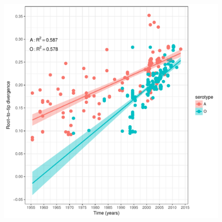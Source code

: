 \documentclass[a4paper,10pt]{article}
\begin{document}
\newpage
\begin{center}
\begin{figure}[H]
\begin{center}
\includegraphics[scale=.75]{FIGURES/PLOTS/rdvs.pdf}
\end{center}
\caption{}
\label{sfig:root-to-tip}
\end{figure}
\end{center}
\end{document}
